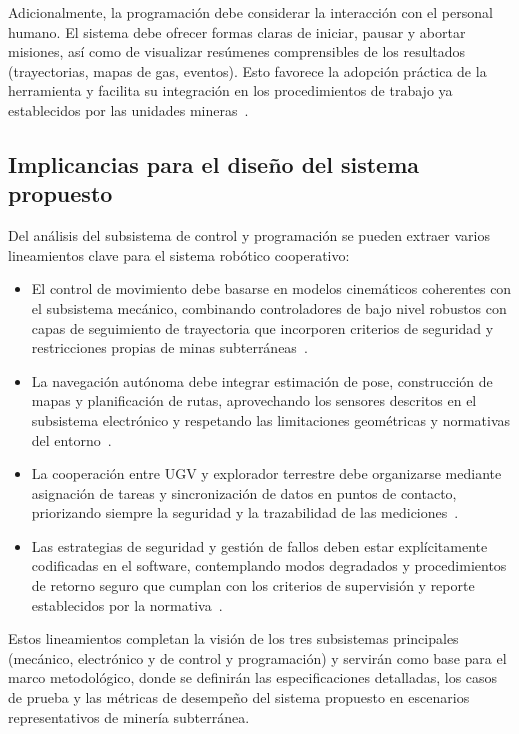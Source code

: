 Adicionalmente, la programación debe considerar la interacción con el personal humano. El sistema debe ofrecer formas claras de iniciar, pausar y abortar misiones, así como de visualizar resúmenes comprensibles de los resultados (trayectorias, mapas de gas, eventos). Esto favorece la adopción práctica de la herramienta y facilita su integración en los procedimientos de trabajo ya establecidos por las unidades mineras~\cite{AdvancesMining_2023}.

\subsection{Implicancias para el diseño del sistema propuesto}

\hspace{1.25cm}
Del análisis del subsistema de control y programación se pueden extraer varios lineamientos clave para el sistema robótico cooperativo:

\begin{itemize}
    \item El control de movimiento debe basarse en modelos cinemáticos coherentes con el subsistema mecánico, combinando controladores de bajo nivel robustos con capas de seguimiento de trayectoria que incorporen criterios de seguridad y restricciones propias de minas subterráneas~\cite{InsectInspired_2020,AdaptiveControl_Mines_2024}.
    \item La navegación autónoma debe integrar estimación de pose, construcción de mapas y planificación de rutas, aprovechando los sensores descritos en el subsistema electrónico y respetando las limitaciones geométricas y normativas del entorno~\cite{KimChoi_2025_MineMapping,MINEM_DS024_2016}.
    \item La cooperación entre UGV y explorador terrestre debe organizarse mediante asignación de tareas y sincronización de datos en puntos de contacto, priorizando siempre la seguridad y la trazabilidad de las mediciones~\cite{OSINERGMIN_BoletinGSM_2020,EU_ExposureDirective_2020}.
    \item Las estrategias de seguridad y gestión de fallos deben estar explícitamente codificadas en el software, contemplando modos degradados y procedimientos de retorno seguro que cumplan con los criterios de supervisión y reporte establecidos por la normativa~\cite{MINEM_DS024_2016,MINEM_Yanaquihua_2023,GEI_MinasPeru_2022}.
\end{itemize}

Estos lineamientos completan la visión de los tres subsistemas principales (mecánico, electrónico y de control y programación) y servirán como base para el marco metodológico, donde se definirán las especificaciones detalladas, los casos de prueba y las métricas de desempeño del sistema propuesto en escenarios representativos de minería subterránea.




